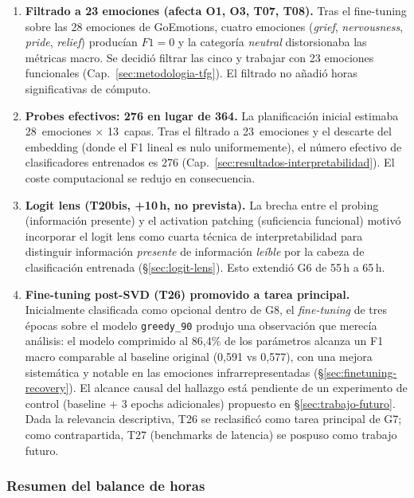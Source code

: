 \begin{enumerate}[nosep]
    \item \textbf{Filtrado a 23 emociones (afecta O1, O3, T07, T08).}
    Tras el fine-tuning sobre las 28 emociones de GoEmotions, cuatro
    emociones (\emph{grief}, \emph{nervousness}, \emph{pride},
    \emph{relief}) producían $F1=0$ y la categoría \emph{neutral}
    distorsionaba las métricas macro. Se decidió filtrar las cinco y
    trabajar con 23 emociones funcionales (Cap.~\ref{sec:metodologia-tfg}).
    El filtrado no añadió horas significativas de cómputo.

    \item \textbf{Probes efectivos: 276 en lugar de 364.} La
    planificación inicial estimaba 28~emociones $\times$ 13~capas. Tras
    el filtrado a 23~emociones y el descarte del embedding (donde el
    F1 lineal es nulo uniformemente), el número efectivo de
    clasificadores entrenados es 276 (Cap.~\ref{sec:resultados-interpretabilidad}).
    El coste computacional se redujo en consecuencia.

    \item \textbf{Logit lens (T20bis, +10\,h, no prevista).} La brecha
    entre el probing (información presente) y el activation patching
    (suficiencia funcional) motivó incorporar el logit lens como cuarta
    técnica de interpretabilidad para distinguir información
    \emph{presente} de información \emph{leíble} por la cabeza de
    clasificación entrenada (\S\ref{sec:logit-lens}). Esto extendió G6
    de 55\,h a 65\,h.

    \item \textbf{Fine-tuning post-SVD (T26) promovido a tarea
    principal.} Inicialmente clasificada como opcional dentro de G8,
    el \emph{fine-tuning} de tres épocas sobre el modelo
    \texttt{greedy\_90} produjo una observación que merecía análisis:
    el modelo comprimido al 86{,}4\% de los parámetros alcanza un F1
    macro comparable al baseline original (0{,}591 vs 0{,}577), con
    una mejora sistemática y notable en las emociones
    infrarrepresentadas (\S\ref{sec:finetuning-recovery}). El alcance
    causal del hallazgo está pendiente de un experimento de control
    (baseline + 3 epochs adicionales) propuesto en
    \S\ref{sec:trabajo-futuro}. Dada la relevancia descriptiva, T26
    se reclasificó como tarea principal de G7; como contrapartida,
    T27 (benchmarks de latencia) se pospuso como trabajo futuro.
\end{enumerate}

\subsubsection{Resumen del balance de horas}

